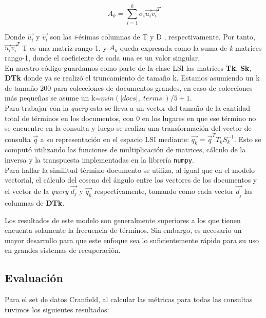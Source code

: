 \documentclass[spanish]{article}
\begin{document}
$$A_{k}=\sum^{k}_{i=1}\sigma_{i}\vec{u_{i}}\vec{v_{i}}^{T}$$

Donde $\vec{u_{i}}$ y $\vec{v_{i}}$ son las \textit{i}-ésimas columnas de T y D , respectivamente. Por tanto, $\vec{u_{i}}\vec{v_{i}}^{T}$ T es una matriz rango-1, y $A_{k}$ queda expresada como la suma de \textit{k} matrices rango-1, donde el coeficiente de cada una es un valor singular.\\

En nuestro código guardamos como parte de la clase LSI las matrices  \textbf{Tk}, \textbf{Sk}, \textbf{DTk} donde ya se realizó el truncamiento de tamaño k. Estamos asumiendo un k de tamaño 200 para colecciones de documentos grandes, en caso de colecciones más pequeñas se asume un k=$min(|docs|,|terms|)/5+1$. \\

Para trabajar con la \emph{query} esta se lleva a un vector del tamaño de la cantidad total de términos en los documentos, con 0 en los lugares en que ese término no se encuentre en la consulta y luego se realiza una transformación del vector de consulta $\vec{q}$ a su representación en el espacio LSI mediante: $\vec{q_{k}}=\vec{q}^{T}T_{k}S_{k}^{-1}$. Esto se computó utilizando las funciones de multiplicación de matrices, cálculo de la inversa y la transpuesta implementadas en la librería \texttt{numpy}. \\

Para hallar la similitud término-documento se utiliza, al igual que en el modelo vectorial, el cálculo del coseno del ángulo entre los vectores de los documentos y el vector de la \emph{query} $\vec{d_{j}}$ y $\vec{q_{k}}$ respectivamente, tomando como cada vector $\vec{d_{_{j}}}$ las columnas de \textbf{DTk}.


Los resultados de este modelo son generalmente superiores a los que tienen encuenta solamente la frecuencia de términos. Sin embargo, es necesario un mayor desarrollo para que este enfoque sea lo suficientemente rápido para su uso en grandes sistemas de recuperación. 

\subsection*{Evaluación}

Para el set de datos Cranfield, al calcular las métricas para todas las consultas tuvimos los siguientes resultados: 
\end{document}
